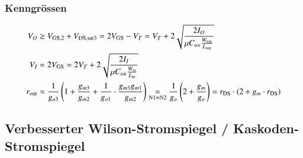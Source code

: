 \subsubsection{Kenngrössen}
\label{Kenngrössen Wilson}

\vspace{-0.4cm}

\begin{align*}
    V_O         &\geq V_{\rm GS,2} + V_{\rm DS,sat3} = 2 V_{\rm GS} - V_T = V_T + 2 \sqrt{ \frac{2 I_O}{\mu C_{\rm ox} \frac{W_{\rm out}}{L_{\rm out}}} }                                                                                           \\
    V_I         &= 2 V_{\rm GS} = 2 V_T + 2 \sqrt{ \frac{2 I_I}{\mu C_{\rm ox} \frac{W_{\rm in}}{L_{\rm in}}} }                                                                                                                                     \\
    r_{\rm out} &\approx \frac{1}{g_{o3}} \left( 1 + \frac{g_{m3}}{g_{m2}} + \frac{1}{g_{o1}} \cdot \frac{g_{m3} g_{m1}}{g_{m2}} \right) \underset{\rm N1 = N2}{=} \frac{1}{g_o} \left( 2 + \frac{g_m}{g_o} \right) = r_{\rm DS} \cdot (2 + g_m \cdot r_{\rm DS})
\end{align*}



\subsection{Verbesserter Wilson-Stromspiegel / Kaskoden-Stromspiegel}

